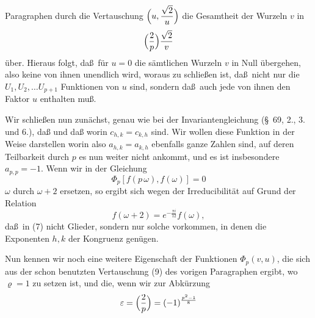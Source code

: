 Paragraphen durch die Vertauschung $\Bigl(u,\dfrac{\sqrt2}{u}\Bigr)$ die
Gesamtheit der Wurzeln $v$ in
\[
\Bigl(\frac{2}{p}\Bigr)\frac{\sqrt2}{v}
\]
\"uber. Hieraus folgt, da\ss\ f\"ur $u=0$ die s\"amtlichen Wurzeln $v$
in Null \"ubergehen, also keine von ihnen unendlich wird, woraus
zu schlie\ss en ist, da\ss\ nicht nur die $U_1, U_2, \ldots U_{p+1}$
 Funktionen von $u$ sind, sondern da\ss\ auch jede
von ihnen den Faktor $u$ enthalten mu\ss.

Wir schlie\ss en nun zun\"achst, genau wie bei der Invariantengleichung
(\S\ 69, 2., 3. und 6.), da\ss
{}
und da\ss
{}
worin $c_{h,k}=c_{k,h}$  sind.
Wir wollen diese Funktion in der Weise darstellen
worin also $a_{h,k}=a_{k,h}$ ebenfalls ganze Zahlen sind, auf deren
Teilbarkeit durch $p$ es nun weiter nicht ankommt, und es ist
insbesondere $a_{p,p}=-1$. Wenn wir in der Gleichung
\[
\Phi_p[f(p\,\omega), f(\omega)]=0
\]
$\omega$ durch $\omega+2$ ersetzen, so ergibt sich wegen der
Irreducibilit\"at auf Grund der Relation
\[
f(\omega+2)=e^{-\frac{\pi i}{12}}f(\omega),
\]
da\ss\ in (7) nicht  Glieder, sondern nur solche vorkommen,
in denen die Exponenten $h, k$ der Kongruenz
gen\"ugen.

Nun kennen wir noch eine weitere Eigenschaft der Funktionen
$\Phi_p(v,u)$, die sich aus der schon benutzten Vertauschung (9)
des vorigen Paragraphen ergibt, wo $\varrho=1$ zu setzen ist, und
die, wenn wir zur Abk\"urzung
\[
\varepsilon=\Bigl(\frac{2}{p}\Bigr)=(-1)^{\frac{p^2-1}{8}}
\]
